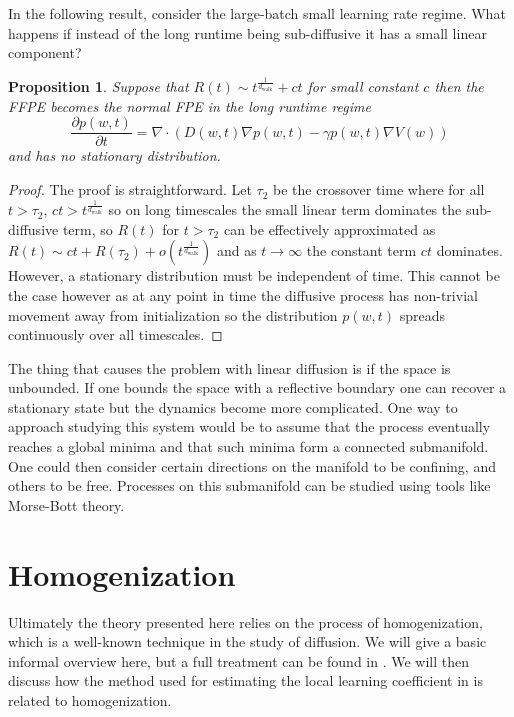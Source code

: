 \documentclass{article} %
\newtheorem{proposition}{Proposition}[section]
\theoremstyle{definition}
\begin{document}
In the following result, consider the large-batch small learning rate regime. What happens if instead of the long runtime being sub-diffusive it has a small linear component?
\begin{proposition}
    Suppose that $R(t) \sim t^{\frac{1}{d_\text{walk}}}+ct$ for small constant $c$ then the FFPE becomes the normal FPE in the long runtime regime
    \begin{equation}
        \frac{\partial p(w,t)}{\partial t} = \nabla \cdot (D(w,t) \nabla p(w,t) - \gamma p(w,t)\nabla V(w))
\end{equation}
and has no stationary distribution.
\end{proposition}
\begin{proof}
    The proof is straightforward. Let $\tau_2$ be the crossover time where for all $t > \tau_2$, $ct > t^{\frac{1}{d_\text{walk}}}$ so on long timescales the small linear term dominates the sub-diffusive term, so $R(t)$ for $t > \tau_2$ can be effectively approximated as $R(t)\sim ct + R(\tau_2) + o(t^\frac{1}{d_\text{walk}})$ and as $t \to \infty$ the constant term $ct$ dominates. However, a stationary distribution must be independent of time. This cannot be the case however as at any point in time the diffusive process has non-trivial movement away from initialization so the distribution $p(w,t)$ spreads continuously over all timescales.
\end{proof}

The thing that causes the problem with linear diffusion is if the space is unbounded. If one bounds the space with a reflective boundary one can recover a stationary state but the dynamics become more complicated. One way to approach studying this system would be to assume that the process eventually reaches a global minima and that such minima form a connected submanifold. One could then consider certain directions on the manifold to be confining, and others to be free. Processes on this submanifold can be studied using tools like Morse-Bott theory.


\section{Homogenization}\label{app:homogen}
Ultimately the theory presented here relies on the process of homogenization, which is a well-known technique in the study of diffusion. We will give a basic informal overview here, but a full treatment can be found in \citep{homogenization}. We will then discuss how the method used for estimating the local learning coefficient in \citep{lau2024locallearningcoefficientsingularityaware} is related to homogenization.
\end{document}
